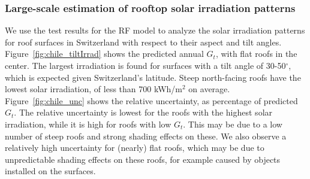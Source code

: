 \subsubsection{Large-scale estimation of rooftop solar irradiation patterns}

We use the test results for the RF model to analyze the solar irradiation patterns for roof surfaces in Switzerland with respect to their aspect and tilt angles. Figure~\ref{fig:chile_tiltIrrad} shows the predicted annual $G_t$, with flat roofs in the center. The largest irradiation is found for surfaces with a tilt angle of 30-50$^\circ$, which is expected given Switzerland’s latitude. Steep north-facing roofs have the lowest solar irradiation, of less than 700 kWh/m$^2$ on average. Figure~\ref{fig:chile_unc} shows the relative uncertainty, as percentage of predicted $G_t$. The relative uncertainty is lowest for the roofs with the highest solar irradiation, while it is high for roofs with low $G_t$. This may be due to a low number of steep roofs and strong shading effects on these. We also observe a relatively high uncertainty for (nearly) flat roofs, which may be due to unpredictable shading effects on these roofs, for example caused by objects installed on the surfaces.


